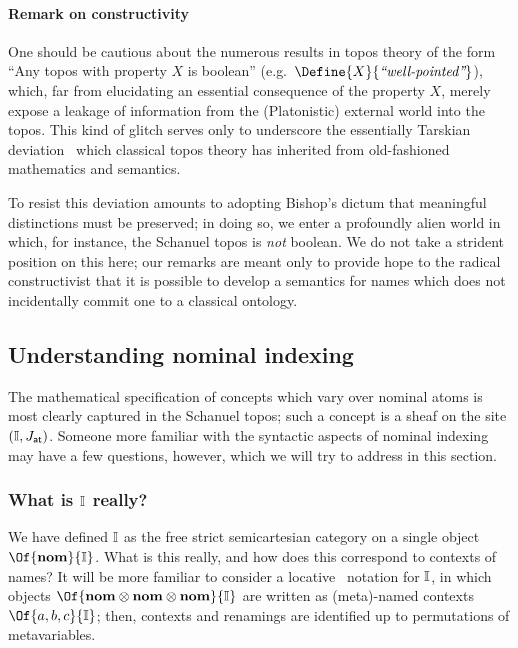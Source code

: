 \documentclass{article}
\newcommand\JAtomic{J_{\mathsf{at}}}
\begin{document}
\paragraph{Remark on constructivity}

One should be cautious about the numerous results in topos theory of
the form ``Any topos with property $X$ is boolean'' (e.g.\
$\Define{X}{\textit{``well-pointed''}}$), which, far from elucidating
an essential consequence of the property $X$, merely expose a leakage
of information from the (Platonistic) external world into the
topos. This kind of glitch serves only to underscore the essentially
Tarskian deviation~\cite{girard:2011} which classical topos theory has
inherited from old-fashioned mathematics and semantics.

To resist this deviation amounts to adopting Bishop's dictum that
meaningful distinctions must be preserved; in doing so, we enter a
profoundly alien world in which, for instance, the Schanuel topos is
\emph{not} boolean. We do not take a strident position on this here;
our remarks are meant only to provide hope to the radical
constructivist that it is possible to develop a semantics for names
which does not incidentally commit one to a classical ontology.


\subsection{Understanding nominal indexing}

The mathematical specification of concepts which vary over nominal
atoms is most clearly captured in the Schanuel topos; such a concept
is a sheaf on the site $(\CatI,\JAtomic)$. Someone more familiar with
the syntactic aspects of nominal indexing may have a few questions,
however, which we will try to address in this section.

\subsubsection{What is $\mathbb{I}$ really?}

We have defined $\mathbb{I}$ as the free strict semicartesian category on a
single object $\Of{\ObjNom}{\CatI}$. What is this really, and how does
this correspond to contexts of names? It will be more familiar to
consider a locative~\cite{girard:2011} notation for $\mathbb{I}$, in
which objects $\Of{\ObjNom\otimes\ObjNom\otimes\ObjNom}{\CatI}$ are
written as (meta)-named contexts $\Of{a,b,c}{\CatI}$; then,
contexts and renamings are identified up to permutations of
metavariables.
\end{document}
